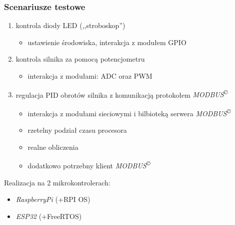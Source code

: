 \documentclass{beamer}
\newcommand{\Esp}{\emph{ESP32}}
\newcommand{\Rpi}{\emph{RaspberryPi}}
\newcommand{\Modbus}{\emph{MODBUS\textsuperscript{\copyright}}}
\begin{document}
\begin{frame}
	\frametitle{Scenariusze testowe}
	\begin{enumerate}
		\item kontrola diody LED (,,stroboskop'')
		      \begin{itemize}
			      \item ustawienie środowiska, interakcja z modułem GPIO
		      \end{itemize}
		\item kontrola silnika za pomocą potencjometru
		      \begin{itemize}
			      \item interakcja z modułami: ADC oraz PWM
		      \end{itemize}
		\item regulacja PID obrotów silnika z komunikacją protokołem \Modbus{}
		      \begin{itemize}
			      \item interakcja z modułami sieciowymi i bilbioteką serwera \Modbus{}
			      \item rzetelny podział czasu procesora
			      \item realne obliczenia
			      \item dodatkowo potrzebny klient \Modbus{}
		      \end{itemize}
	\end{enumerate}

	Realizacja na 2 mikrokontrolerach:
	\begin{multicols}{2}
		\begin{itemize}
			\item \Rpi{} (+RPI OS)
			\item \Esp{} (+FreeRTOS)
		\end{itemize}
	\end{multicols}
\end{frame}
\end{document}
